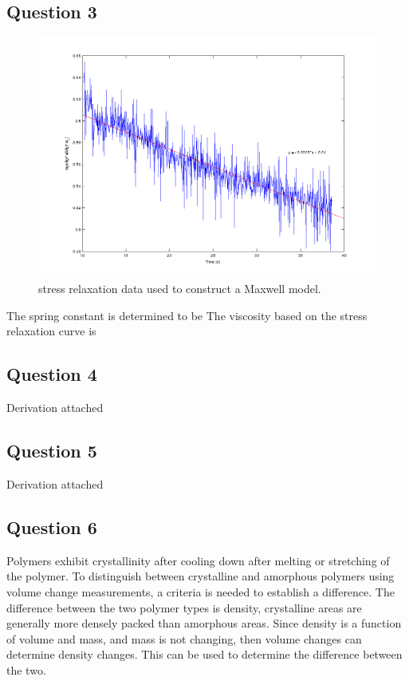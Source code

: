 \documentclass[12pt]{report}
\begin{document}
\subsection{Question 3}
\begin{figure}[H]
	\includegraphics[width=1\textwidth]{problem3.png}
	\caption{stress relaxation data used to construct a Maxwell model.}
	\label{fig:Figure2}
\end{figure}

The spring constant is determined to be 
The viscosity based on the stress relaxation curve is

\subsection{Question 4}
Derivation attached

\subsection{Question 5}
Derivation attached

\subsection{Question 6}
Polymers exhibit crystallinity after cooling down after melting or stretching of the polymer. To distinguish between crystalline and amorphous polymers using volume change measurements, a criteria is needed to establish a difference. The difference between the two polymer types is density, crystalline areas are generally more densely packed than amorphous areas. Since density is a function of volume and mass, and mass is not changing, then volume changes can determine density changes. This can be used to determine the difference between the two.
\end{document}
